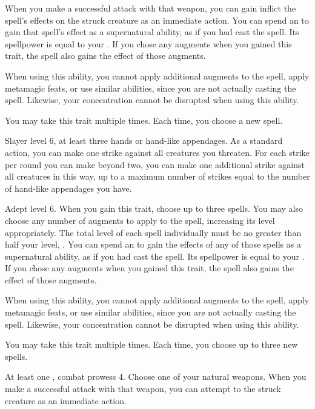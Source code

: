     When you make a successful attack with that weapon, you can gain inflict the spell's effects on the struck creature as an immediate action.
    You can spend an  to gain that spell's effect as a supernatural ability, as if you had cast the spell.
    Its spellpower is equal to your .
    If you chose any augments when you gained this trait, the spell also gains the effect of those augments.

    When using this ability, you cannot apply additional augments to the spell, apply metamagic feats, or use similar abilities, since you are not actually casting the spell.
    Likewise, your concentration cannot be disrupted when using this ability.

     You may take this trait multiple times.
    Each time, you choose a new spell.

    \featpres Slayer level 6, at least three hands or hand-like appendages.
    \featben As a standard action, you can make one strike against all creatures you threaten.
    For each strike per round you can make beyond two, you can make one additional strike against all creatures in this way, up to a maximum number of strikes equal to the number of hand-like appendages you have.

    \featpre Adept level 6.
    \featben When you gain this trait, choose up to three spells.
    You may also choose any number of augments to apply to the spell, increasing its level appropriately.
    The total level of each spell individually must be no greater than half your level, .
    You can spend an  to gain the effects of any of those spells as a supernatural ability, as if you had cast the spell.
    Its spellpower is equal to your .
    If you chose any augments when you gained this trait, the spell also gains the effect of those augments.

    When using this ability, you cannot apply additional augments to the spell, apply metamagic feats, or use similar abilities, since you are not actually casting the spell.
    Likewise, your concentration cannot be disrupted when using this ability.

     You may take this trait multiple times.
    Each time, you choose up to three new spells.

    \featpre At least one , combat prowess 4.
    \featben Choose one of your natural weapons.
    When you make a successful attack with that weapon, you can attempt to  the struck creature as an immediate action.


